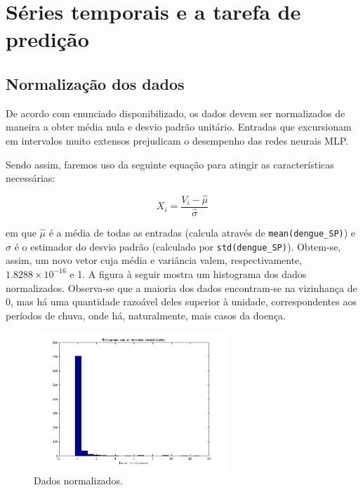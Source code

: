 \section{Séries temporais e a tarefa de predição}


\setcounter{subsection}{-1}
\subsection{Normalização dos dados}

	De acordo com enunciado disponibilizado, os dados devem ser normalizados de
	maneira a obter média nula e desvio padrão unitário. Entradas que excursionam
	em intervalos muito extensos prejudicam o desempenho das redes neurais MLP.
	
	\vspace{12pt}
	
	Sendo assim, faremos uso da seguinte equação para atingir as características
	necessárias:
	
	\begin{equation}
	X_i = \frac{V_i - \hat{\mu}}{\hat{\sigma}}
	\end{equation}
	
	em que \(\hat{\mu}\) é a média de todas as entradas (calcula através de
	\texttt{mean(dengue\_SP)}) e \(\hat{\sigma}\) é o estimador do desvio padrão
	(calculado por \texttt{std(dengue\_SP)}). Obtem-se, assim, um novo vetor cuja
	média e variância valem, respectivamente, \(1.8288\times10^{-16}\) e 1. A
	figura à seguir mostra um histograma dos dados normalizados. Observa-se que a
	maioria dos dados encontram-se na vizinhança de 0, mas há uma quantidade
	razoável deles superior à unidade, correspondentes aos períodos de chuva, onde
	há, naturalmente, mais casos da doença.
	
	\begin{figure}[H]
			\centering
			  \includegraphics[width=0.65\textwidth]{image/hist_normalizados}
			  \caption{Dados normalizados.} 
			  \label{hist3}
	\end{figure}
	
